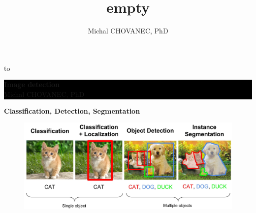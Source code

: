 \documentclass[xcolor=dvipsnames]{beamer}
\title{\color{white} \bf empty}
\author{\color{white} Michal CHOVANEC, PhD}
\date[EURP]{}
\begin{document}
{
    \usebackgroundtemplate
    {
        \vbox to 
    }
    \begin{frame}



    \centering
     \colorbox{black}
     {
        \begin{minipage}{7cm}
           {\LARGE \color{white} \bf Image detection} \\
           {\LARGE \color{white} Michal CHOVANEC, PhD} \\
       \end{minipage}
     }


    \end{frame}
}

\begin{frame}{\bf Classification, Detection, Segmentation}

\begin{figure}
  \includegraphics[scale=0.1]{../../pictures/cds.jpg}
\end{figure}

\end{frame}
\end{document}
